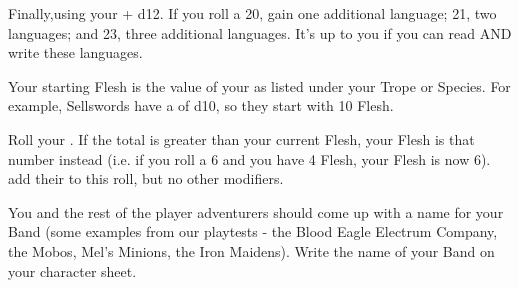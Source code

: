 {Finally,\RO using your \INT + d12.  If you roll a 20, gain one additional language; 21, two languages; and 23, three additional languages. It's up to you if you can read AND write these languages.



Your starting Flesh is the \MAX value of your \FLESH as listed under your Trope or Species.  For example, Sellswords have a \FLESH of d10, so they start with 10 Flesh.  

Roll your \VIG.  If the total is greater than your current Flesh, your Flesh is that number instead (i.e. if you roll a 6 and you have 4 Flesh, your Flesh is now 6).  add their \LVL to this roll, but no other modifiers.


  You and the rest of the player adventurers should come up with a name for your Band (some examples from our playtests - the Blood Eagle Electrum Company, the Mobos, Mel's Minions, the Iron Maidens).  Write the name of your Band on your character sheet.

} %
